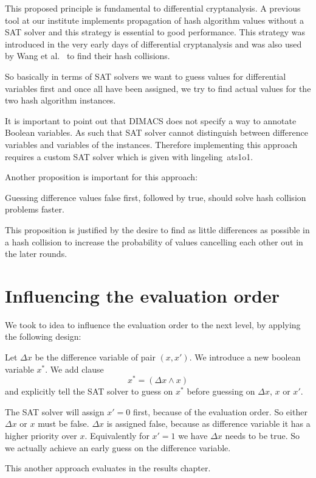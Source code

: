 This proposed principle is fundamental to differential cryptanalysis. A previous tool
at our institute implements propagation of hash algorithm values without a SAT solver
and this strategy is essential to good performance. This strategy was introduced
in the very early days of differential cryptanalysis and was also used by Wang et
al.~\cite{wang2004} to find their hash collisions.

So basically in terms of SAT solvers we want to guess values for differential variables
first and once all have been assigned, we try to find actual values for the two
hash algorithm instances.

It is important to point out that DIMACS does not specify a way to annotate Boolean
variables. As such that SAT solver cannot distinguish between difference variables
and variables of the instances. Therefore implementing this approach requires a custom
SAT solver which is given with lingeling~ats1o1.

Another proposition is important for this approach:

\begin{prop}
  Guessing difference values false first, followed by true,
  should solve hash collision problems faster.
\end{prop}

This proposition is justified by the desire to find as little differences as possible
in a hash collision to increase the probability of values cancelling each other out
in the later rounds.

\section{Influencing the evaluation order}
\label{sec:enc-diff-desc-eo}
%
We took to idea to influence the evaluation order to the next level,
by applying the following design:

Let $\Delta x$ be the difference variable of pair $(x, x')$. We introduce a new boolean
variable $x^*$. We add clause
\[ x^* = (\Delta x \land x) \]
and explicitly tell the SAT solver to guess on $x^*$ before guessing on $\Delta x$, $x$ or $x'$.

The SAT solver will assign $x'=0$ first, because of the evaluation order. So either $\Delta x$
or $x$ must be false. $\Delta x$ is assigned false, because as difference variable it has a higher
priority over $x$. Equivalently for $x'=1$ we have $\Delta x$ needs to be true. So we actually
achieve an early guess on the difference variable.

This another approach evaluates in the results chapter.
